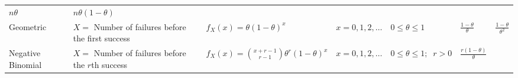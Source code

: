 \documentclass[]{book}
\begin{document}
\begin{landscape}
\begin{longtable}[]{@{}lllllll@{}}
\begin{minipage}[t]{0.05\columnwidth}
\(n\theta\)\strut
\end{minipage} & \begin{minipage}[t]{0.09\columnwidth}\raggedright
\(n\theta(1-\theta)\)\strut
\end{minipage}\tabularnewline
\begin{minipage}[t]{0.10\columnwidth}\raggedright
Geometric\strut
\end{minipage} & \begin{minipage}[t]{0.13\columnwidth}\raggedright
\(X=\) Number of failures before the first success\strut
\end{minipage} & \begin{minipage}[t]{0.16\columnwidth}\raggedright
\(f_X(x)= \theta (1-\theta)^x\)\strut
\end{minipage} & \begin{minipage}[t]{0.14\columnwidth}\raggedright
\(x=0,1,2,\dots\)\strut
\end{minipage} & \begin{minipage}[t]{0.16\columnwidth}\raggedright
\(0\leq \theta \leq 1\)\strut
\end{minipage} & \begin{minipage}[t]{0.05\columnwidth}\raggedright
\(\frac{1-\theta}{\theta}\)\strut
\end{minipage} & \begin{minipage}[t]{0.09\columnwidth}\raggedright
\(\frac{1-\theta}{\theta^2}\)\strut
\end{minipage}\tabularnewline
\begin{minipage}[t]{0.10\columnwidth}\raggedright
Negative Binomial\strut
\end{minipage} & \begin{minipage}[t]{0.13\columnwidth}\raggedright
\(X=\) Number of failures before the \(r\)th success\strut
\end{minipage} & \begin{minipage}[t]{0.16\columnwidth}\raggedright
\(f_X(x)= {x+r-1\choose r-1} \theta^r (1-\theta)^x\)\strut
\end{minipage} & \begin{minipage}[t]{0.14\columnwidth}\raggedright
\(x=0,1,2,\dots\)\strut
\end{minipage} & \begin{minipage}[t]{0.16\columnwidth}\raggedright
\(0\leq \theta \leq 1; \;\; r > 0\)\strut
\end{minipage} & \begin{minipage}[t]{0.05\columnwidth}\raggedright
\(\frac{r(1-\theta)}{\theta}\)\strut

\end{minipage}
\end{longtable}
\end{landscape}
\end{document}
